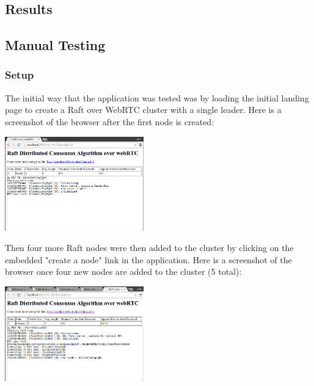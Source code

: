 \documentclass[9pt]{extarticle}
\begin{document}
\begin{multicols}{2}
\section{Results}

\subsection{Manual Testing}

\subsubsection{Setup}

The initial way that the application was tested was by loading the
initial landing page to create a Raft over WebRTC cluster with
a single leader. Here is a screenshot of the browser after the first
node is created:

\begin{center}
    \includegraphics[width=0.45\textwidth]{imgs/browser_1.png}
    \label{fig:browser_1}
\end{center}

Then four more Raft nodes were then added to the cluster by clicking
on the embedded "create a node" link in the application. Here is
a screenshot of the browser once four new nodes are added to the
cluster (5 total):

\begin{center}
    \includegraphics[width=0.45\textwidth]{imgs/browser_5.png}
    \label{fig:browser_5}
\end{center}


\end{multicols}
\end{document}
